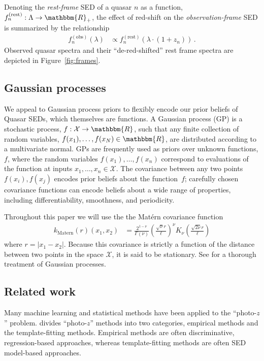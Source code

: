 \documentclass{article}
\newcommand{\R}{\mathbbm{R}}
\newcommand{\mcX}{\mathcal{X}}
\begin{document}
Denoting the \emph{rest-frame} SED of a quasar $n$ as a function, $f_n^{(\text{rest})} : \Lambda \rightarrow \R_+$, the effect of red-shift on the \emph{observation-frame} SED is summarized by the relationship 
\begin{align}
  f_n^{(\text{obs})}(\lambda) &\propto f_n^{(\text{rest})}(\lambda \cdot (1 + z_n)) \, .
\end{align}
Observed quasar spectra and their ``de-red-shifted'' rest frame spectra are depicted in Figure~\ref{fig:frames}.

\subsection{Gaussian processes}
We appeal to Gaussian process priors to flexibly encode our prior beliefs of Quasar SEDs, which themselves are functions. A Gaussian process (GP) is a stochastic process, $f: \mathcal{X} \rightarrow \R$, such that any finite collection of random variables, ${f(x_1),\dots, f(x_N) \in \R}$, are distributed according to a multivariate normal.  
GPs are frequently used as priors over unknown functions, $f$, where the random variables $f(x_1), \dots, f(x_n)$ correspond to evaluations of the function at inputs $x_1, \dots, x_n \in \mcX$.  
The covariance between any two points $f(x_i), f(x_j)$ encodes prior beliefs about the function~$f$; carefully chosen covariance functions can encode beliefs about a wide range of properties, including differentiability, smoothness, and periodicity.  

Throughout this paper we will use the the Mat\'{e}rn \cite{Matern1986spatial} covariance function
\begin{align}
  k_{\text{Matern}}(r)(x_1, x_2) 
    &= \frac{2^{1-\nu}}{\Gamma(\nu)} 
       \left( \frac{\sqrt{\nu} r}{\ell} \right) ^\nu
       K_\nu\left( \frac{\sqrt{2\nu} r}{\ell}\right)
\end{align}
where $r = |x_1 - x_2|$.  Because this covariance is strictly a function of the distance between two points in the space $\mcX$, it is said to be stationary. 
See \cite{rasmussen2006gaussian} for a thorough treatment of Gaussian processes.  

\subsection{Related work}
Many machine learning and statistical methods have been applied to the ``photo-$z$'' problem. 
\citet{walcher2011fitting} divides ``photo-$z$'' methods into two categories, empirical methods and the template-fitting methods.  Empirical methods are often discriminative, regression-based approaches, whereas template-fitting methods are often SED model-based approaches.  
\end{document}
